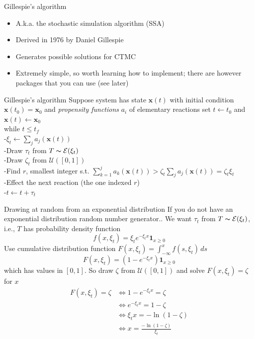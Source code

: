 \documentclass[aspectratio=169]{beamer}
\begin{document}
\begin{frame}{Gillespie's algorithm}
    \begin{itemize}
        \item A.k.a. the stochastic simulation algorithm (SSA)
        \vfill
        \item Derived in 1976 by Daniel Gillespie
        \vfill
        \item Generates possible solutions for CTMC
        \vfill
        \item Extremely simple, so worth learning how to implement; there are however packages that you can use (see later)
    \end{itemize}
\end{frame}


\begin{frame}{Gillespie's algorithm}
Suppose system has state $\mathbf{x}(t)$ with initial condition $\mathbf{x}(t_0)=\mathbf{x}_0$ and \emph{propensity functions} $a_i$ of elementary reactions
\vfill
set $t\leftarrow t_0$ and $\mathbf{x}(t)\leftarrow \mathbf{x}_0$\\
while {$t\leq t_f$}\\
-\qquad $\xi_t\leftarrow \sum_j a_j(\mathbf{x}(t))$\\
-\qquad Draw $\tau_t$ from $T\thicksim \mathcal{E}(\xi_t)$\\
-\qquad Draw $\zeta_t$ from $\mathcal{U}([0,1])$\\
-\qquad Find $r$, smallest integer s.t. $\sum_{k=1}^j a_k(\mathbf{x}(t))> \zeta_t\sum_j a_j(\mathbf{x}(t))=\zeta_t\xi_t$\\
-\qquad Effect the next reaction (the one indexed $r$)\\
-\qquad $t\leftarrow t+\tau_t$\\    
\end{frame}


\begin{frame}{Drawing at random from an exponential distribution}
    If you do not have an exponential distribution random number generator.. We want $\tau_t$ from $T\thicksim\mathcal{E}(\xi_t)$, i.e., $T$ has probability density function
    $$
    f(x,\xi_t)=
    \xi_te^{-\xi_t x}\mathbf{1}_{x\geq 0}
    $$
    Use cumulative distribution function $F(x,\xi_t)=\int_{-\infty}^x f(s,\xi_t)\,ds$
    $$
    F(x,\xi_t)=
    (1-e^{-\xi_t x})\mathbf{1}_{x\geq 0}
    $$
    which has values in $[0,1]$. So draw $\zeta$ from $\mathcal{U}([0,1])$ and solve $F(x,\xi_t)=\zeta$ for $x$
    \begin{align*}
    F(x,\xi_t)=\zeta & \Leftrightarrow 1-e^{-\xi_tx}=\zeta \\
    &\Leftrightarrow e^{-\xi_tx} = 1-\zeta \\
    &\Leftrightarrow \xi_tx = -\ln(1-\zeta) \\
    &\Leftrightarrow \boxed{x = \frac{-\ln(1-\zeta)}{\xi_t}}
    \end{align*}
\end{frame}
\end{document}
